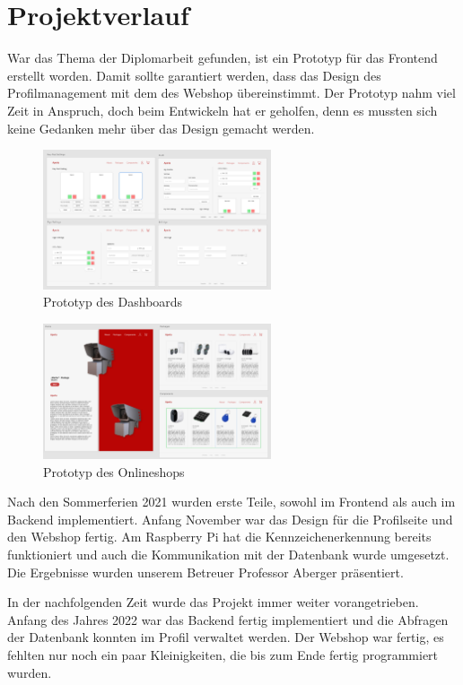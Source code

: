 \section{Projektverlauf}
War das Thema der Diplomarbeit gefunden, ist ein Prototyp für das Frontend erstellt worden. Damit sollte garantiert werden, dass das Design des Profilmanagement mit dem des Webshop übereinstimmt. Der Prototyp nahm viel Zeit in Anspruch, doch beim Entwickeln hat er geholfen, denn es mussten sich keine Gedanken mehr über das Design gemacht werden.
\begin{figure}[H]
    \centering
    \includegraphics[width=0.6\textwidth]{pics/DashboardPrototyp.png}
    \caption{Prototyp des Dashboards}
  \end{figure}
  \begin{figure}[H]
    \centering
    \includegraphics[width=0.6\textwidth]{pics/ShopPrototyp.png}
    \caption{Prototyp des Onlineshops}
  \end{figure}
  \newpage

Nach den Sommerferien 2021 wurden erste Teile, sowohl im Frontend als auch im Backend implementiert. Anfang November war das Design für die Profilseite und den Webshop fertig. Am Raspberry Pi hat die Kennzeichenerkennung bereits funktioniert und auch die Kommunikation mit der Datenbank wurde umgesetzt. Die Ergebnisse wurden unserem Betreuer Professor Aberger präsentiert.

In der nachfolgenden Zeit wurde das Projekt immer weiter vorangetrieben.  Anfang des Jahres 2022 war das Backend fertig implementiert und die Abfragen der Datenbank konnten im Profil verwaltet werden. Der Webshop war fertig, es fehlten nur noch ein paar Kleinigkeiten, die bis zum Ende fertig programmiert wurden. 

